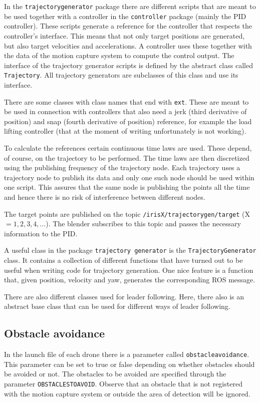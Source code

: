 \documentclass[titlepage,11pt,a4paper]{article}
\begin{document}
In the \texttt{trajectory\textunderscore generator} package there are
different scripts that are meant to be used together with a controller
in the \texttt{controller} package (mainly the PID controller). These
scripts generate a reference for the controller that respects the
controller's interface. This means that not only target positions are
generated, but also target velocities and accelerations. A controller
uses these together with the data of the motion capture system to
compute the control output. The interface of the trajectory generator
scripts is defined by the abstract class called
\texttt{Trajectory}. All trajectory generators are subclasses of this
class and use its interface.

There are some classes with class names that end with
\texttt{\textunderscore ext}. These are meant to be used in connection
with controllers that also need a jerk (third derivative of position)
and snap (fourth derivative of position) reference, for example the load
lifting controller (that at the moment of writing unfortunately is not
working).

To calculate the references certain continuous time laws are
used. These depend, of course, on the trajectory to be performed. The
time laws are then discretized using the publishing frequency of the
trajectory node. Each trajectory uses a trajectory node to publish its
data and only one such node should be used within one script. This
assures that the same node is publishing the points all the time and
hence there is no risk of interference between different nodes.

The target points are published on the topic
\texttt{/irisX/trajectory\textunderscore gen/target} (X $= 1, 2, 3,
4, \dots$). The blender subscribes to this topic and passes the
necessary information to the PID.

A useful class in the package \texttt{trajectory\textunderscore
  generator} is the \texttt{TrajectoryGenerator} class. It contains a
collection of different functions that have turned out to be useful
when writing code for trajectory generation. One nice feature is a
function that, given position, velocity and yaw, generates the
corresponding ROS message.

There are also different classes used for leader following. Here,
there also is an abstract base class that can be used for different
ways of leader following.

\subsection{Obstacle avoidance}
\label{subsec:obstacle_avoidance}
In the launch file of each drone there is a parameter called
\texttt{obstacle\textunderscore avoidance}. This parameter can be set to true
or false depending on whether obstacles should be avoided or not. The
obstacles to be avoided are specified through the parameter
\texttt{OBSTACLES\textunderscore TO\textunderscore AVOID}. Observe that an
obstacle that is not registered with the motion capture system or
outside the area of detection will be ignored.
\end{document}
